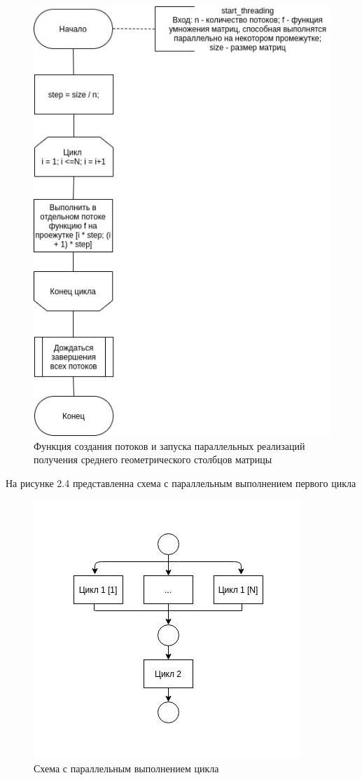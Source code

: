     \begin{figure}[h]
    	\centering
    	\includegraphics[scale=0.80]{start_threading.jpg}
    	\caption{Функция создания потоков и запуска параллельных реализаций получения среднего геометрического столбцов матрицы}
    	\label{fig:mpr}
    \end{figure}
    
    
    На рисунке 2.4 представленна схема с параллельным выполнением первого цикла
    
    \begin{figure}[h]
    	\centering
    	\includegraphics[scale=0.9]{parallel_scheme_01.jpg}
    	\caption{Схема с параллельным выполнением цикла}
    	\label{fig:mpr}
    \end{figure}
    
